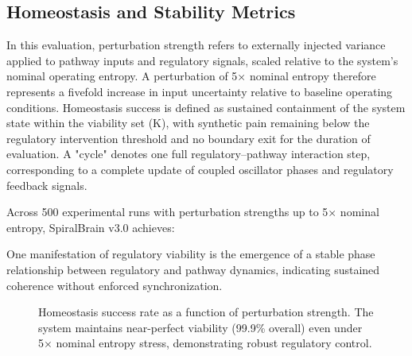 \documentclass[12pt,a4paper]{report}
\begin{document}
\subsection{Homeostasis and Stability Metrics}

In this evaluation, perturbation strength refers to externally injected variance applied to pathway inputs and regulatory signals, scaled relative to the system's nominal operating entropy. A perturbation of 5× nominal entropy therefore represents a fivefold increase in input uncertainty relative to baseline operating conditions. Homeostasis success is defined as sustained containment of the system state within the viability set (K), with synthetic pain remaining below the regulatory intervention threshold and no boundary exit for the duration of evaluation. A "cycle" denotes one full regulatory–pathway interaction step, corresponding to a complete update of coupled oscillator phases and regulatory feedback signals.

Across 500 experimental runs with perturbation strengths up to 5× nominal entropy, SpiralBrain v3.0 achieves:

One manifestation of regulatory viability is the emergence of a stable phase relationship between regulatory and pathway dynamics, indicating sustained coherence without enforced synchronization.

\begin{figure}[H]
\centering
{}
\caption{Homeostasis success rate as a function of perturbation strength. The system maintains near-perfect viability (99.9\% overall) even under 5× nominal entropy stress, demonstrating robust regulatory control.}
\label{fig:homeostasis_perturbation}
\end{figure}
\end{document}
